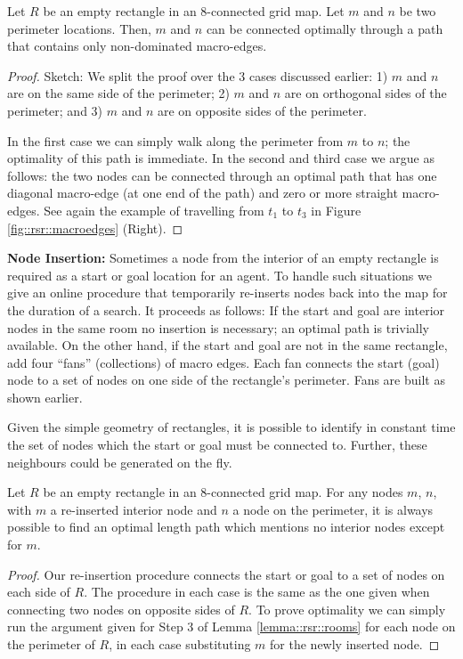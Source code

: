 \begin{lemma} \label{lemma::rsr::rooms} Let $R$ be an empty rectangle in
an 8-connected grid map. Let $m$ and $n$ be two perimeter locations.
Then, $m$ and $n$ can be connected optimally through a path that
contains only non-dominated macro-edges.
\end{lemma}

\begin{proof}Sketch:
We split the proof over the 3 cases discussed earlier: 1) {$m$ and $n$ are on
the same side of the perimeter;} 2) {\label{lemma::rsr::rooms-step2}$m$ and $n$ are on
orthogonal sides of the perimeter;} and 3) {\label{lemma::rsr::rooms-step3} $m$ and
$n$ are on opposite sides of the perimeter.}

In the first case we can simply walk along the perimeter from $m$ to $n$; the
optimality of this path is immediate. In the second and third case we argue as
follows:
the two nodes can be connected through an optimal path that has one diagonal macro-edge
(at one end of the path) and zero or more straight macro-edges.
See again the example of travelling from $t_1$ to $t_3$ in Figure
\ref{fig::rsr::macroedges} (Right).
\end{proof}

\noindent
\textbf{Node Insertion:}
Sometimes a node from the interior of an empty rectangle is required as a start
or goal location for an agent.  To handle such situations we give an online
procedure that temporarily re-inserts nodes back into the map for the duration
of a search.  It proceeds as follows: {If the start and goal are interior nodes
in the same room no insertion is necessary; an optimal path is trivially
available. } {On the other hand, if the start and goal are not in the same
rectangle, add four ``fans'' (collections) of macro edges.  Each fan connects
the start (goal) node to a set of nodes on one side of the rectangle's
perimeter.  Fans are built as shown earlier.}

Given the simple geometry of rectangles, it is possible to identify in constant
time the set of nodes which the start or goal must be connected to.  Further,
these neighbours could be generated on the fly.

\begin{lemma}
\label{lemma::rsr::insertion}
Let $R$ be an empty rectangle in an 8-connected grid map.  For any
nodes $m$, $n$, with $m$ a re-inserted interior node and $n$ a node on the
perimeter, it is always possible to find an optimal length path which mentions
no interior nodes except for $m$.
\end{lemma}
\begin{proof}
Our re-insertion procedure connects the start or goal to a set of nodes on each
side of $R$.  The procedure in each case is the same as the one given when
connecting two nodes on opposite sides of $R$.  To prove optimality we can
simply run the argument given for Step 3 of Lemma \ref{lemma::rsr::rooms} for each
node on the perimeter of $R$, in each case substituting $m$ for the newly
inserted node.
\end{proof}

